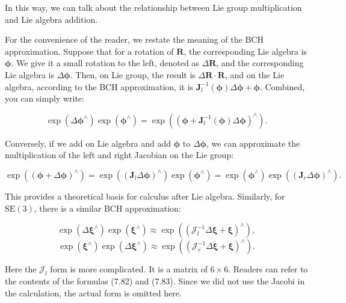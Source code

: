In this way, we can talk about the relationship between Lie group multiplication and Lie algebra addition.

For the convenience of the reader, we restate the meaning of the BCH approximation. Suppose that for a rotation of $\bm{R}$, the corresponding Lie algebra is $\boldsymbol{\phi}$. We give it a small rotation to the left, denoted as $\Delta \bm{R}$, and the corresponding Lie algebra is $\Delta \boldsymbol{\phi}$. Then, on Lie group, the result is $ \Delta \bm{R} \cdot \bm{R}$, and on the Lie algebra, according to the BCH approximation, it is $\bm{J}_l^{-1 } (\boldsymbol{\phi}) \Delta \boldsymbol{\phi} + \boldsymbol{\phi}$. Combined, you can simply write:

\begin{equation}
\exp \left( {\Delta { \boldsymbol{\phi} ^ \wedge }} \right)\exp \left( {{ \boldsymbol{\phi} ^ \wedge }} \right) = \exp \left( {{{\left( { \boldsymbol{\phi}  + \bm{J}_l^{ - 1}\left( \boldsymbol{\phi}  \right)\Delta \boldsymbol{\phi} } \right)}^ \wedge }} \right).
\end{equation}

Conversely, if we add on Lie algebra and add $\boldsymbol{\phi}$ to $\Delta \boldsymbol{\phi}$, we can approximate the multiplication of the left and right Jacobian on the Lie group:

\begin{equation}
\exp \left( {{{\left( { \boldsymbol{\phi}  + \Delta \boldsymbol{\phi} } \right)}^ \wedge }} \right) = \exp \left( {{{\left( {{ \bm{J}_l}\Delta \boldsymbol{\phi} } \right)}^ \wedge }} \right)\exp \left( {{ \boldsymbol{\phi} ^ \wedge }} \right) = \exp \left( {{\boldsymbol{\phi} ^ \wedge }} \right)\exp \left( {{{\left( {{\bm{J}_r}\Delta \boldsymbol{\phi} } \right)}^ \wedge }} \right).
\end{equation}

This provides a theoretical basis for calculus after Lie algebra. Similarly, for $\mathrm{SE}(3)$, there is a similar BCH approximation:

\begin{equation}
\exp \left( {\Delta {\boldsymbol{\xi} ^ \wedge }} \right)\exp \left( {{ \boldsymbol{\xi} ^ \wedge }} \right) \approx \exp \left( {{{\left( {{ \bm{\mathcal{J}}_l^{-1} }\Delta \boldsymbol{\xi}  + \boldsymbol{\xi} } \right)}^ \wedge }} \right),
\end{equation}
\begin{equation}
\exp \left( {{ \boldsymbol{\xi} ^ \wedge }} \right) \exp \left( {\Delta {\boldsymbol{\xi} ^ \wedge }} \right)  \approx \exp \left( {{{\left( {{ \bm{\mathcal{J}}_r^{-1} }\Delta \boldsymbol{\xi}  + \boldsymbol{\xi} } \right)}^ \wedge }} \right).
\end{equation}

Here the $\bm{\mathcal{J}}_l$ form is more complicated. It is a matrix of $6 \times 6$. Readers can refer to the contents of the \cite{Barfoot2016} formulas (7.82) and (7.83). Since we did not use the Jacobi in the calculation, the actual form is omitted here.